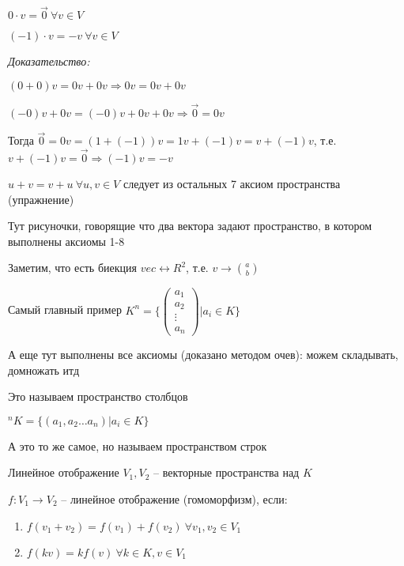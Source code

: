 \documentclass[12pt]{article}
\begin{document}
\vspace{5mm}

\begin{lem}{}
    $0 \cdot v = \overrightarrow{0}\ \forall v \in V$

    $(-1) \cdot v = -v\ \forall v \in V$
\end{lem}

\textit{Доказательство:}

$(0 + 0)v = 0v + 0v \Rightarrow 0v = 0v + 0v$

$(-0)v + 0v = (-0)v + 0v + 0v \Rightarrow \overrightarrow{0} = 0v$

Тогда $\overrightarrow{0} = 0v = (1 + (-1))v = 1v + (-1)v = v + (-1)v$, т.е. $v + (-1)v = \overrightarrow{0} \Rightarrow (-1)v = -v$

\begin{Remark}{}
    $u + v = v + u\ \forall u, v \in V$ следует из остальных 7 аксиом пространства (упражнение)
\end{Remark}

\begin{Example}{}
    Тут рисуночки, говорящие что два вектора задают пространство, в котором выполнены аксиомы 1-8

    Заметим, что есть биекция $vec \leftrightarrow R^2$, т.е. $v \rightarrow {a \choose b}$
\end{Example}

\begin{Example}{Самый главный пример}
    $K^n = \{\left( \begin{gathered}
        a_1 \\
        a_2 \\
        \vdots \\
        a_n
    \end{gathered} \right) | a_i \in K\}$

    А еще тут выполнены все аксиомы (доказано методом очев): можем складывать, домножать итд

    Это называем пространство столбцов

    \vspace{3mm}

    $^nK = \{ (a_1, a_2 \ldots a_n) | a_i \in K\}$

    А это то же самое, но называем пространством строк
\end{Example}

\vspace{5mm}

\begin{defin}{Линейное отображение}
    $V_1, V_2$ -- векторные пространства над $K$

    $f : V_1 \rightarrow V_2$ -- линейное отображение (гомоморфизм), если:

    \begin{enumerate}
        \item $f(v_1 + v_2) = f(v_1) + f(v_2)\ \forall v_1, v_2 \in V_1$
        \item $f(kv) = kf(v)\ \forall k \in K, v \in V_1$
    \end{enumerate}
\end{defin}
\end{document}
